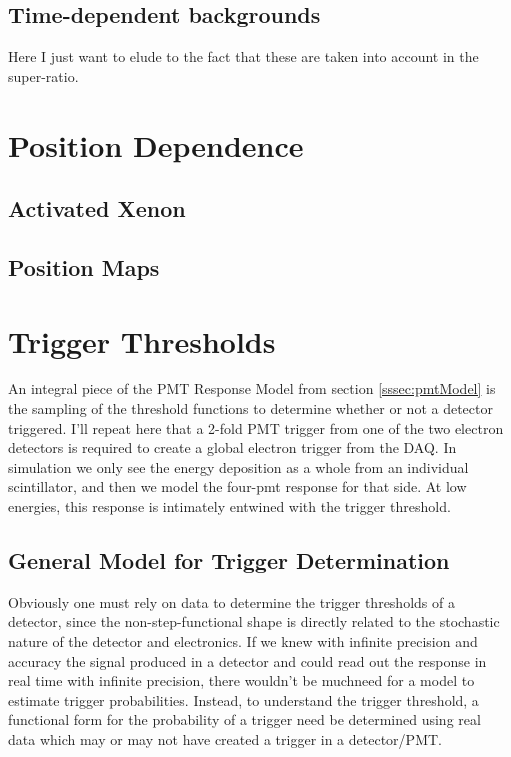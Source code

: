 \subsection{Time-dependent backgrounds}
Here I just want to elude to the fact that these are taken into account in
the super-ratio.


\section{Position Dependence}

\subsection{Activated Xenon}


\subsection{Position Maps}


\section{Trigger Thresholds}
An integral piece of the PMT Response Model from section \ref{sssec:pmtModel} 
is the sampling of the threshold functions to determine whether or not a detector
triggered. I'll repeat here that a 2-fold PMT trigger from one of the two electron
detectors is required to create a global electron trigger from the DAQ. In simulation
we only see the energy deposition as a whole from an individual scintillator, and then
we model the four-pmt response for that side. At low energies, this response is 
intimately entwined with the trigger threshold.

\subsection{General Model for Trigger Determination} \label{ssec:genTrigModel}
Obviously one must rely on data to determine the trigger thresholds of a detector, since
the non-step-functional shape is directly related to the stochastic nature 
of the detector and electronics. If we knew with infinite precision and 
accuracy the signal produced in a detector
and could read out the response in real time with infinite precision, 
there wouldn't be muchneed for a model to estimate trigger probabilities. 
Instead, to understand the trigger threshold, a functional 
form for the probability of a trigger need be determined using real data which may or 
may not have created a trigger in a detector/PMT. 

